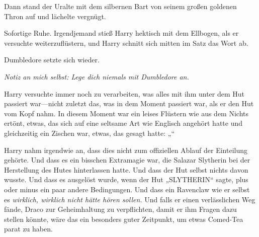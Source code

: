 Dann stand der Uralte mit dem silbernen Bart von seinem großen goldenen Thron auf und lächelte vergnügt.

Sofortige Ruhe. Irgendjemand stieß Harry hektisch mit dem Ellbogen, als er versuchte weiterzuflüstern, und Harry schnitt sich mitten im Satz das Wort ab.

Dumbledore setzte sich wieder.

\emph{Notiz an mich selbst: Lege dich niemals mit Dumbledore an.}

Harry versuchte immer noch zu verarbeiten, was alles mit ihm unter dem Hut passiert war—nicht zuletzt das, was in dem Moment passiert war, als er den Hut vom Kopf nahm. In diesem Moment war ein leises Flüstern wie aus dem Nichts ertönt, etwas, das sich auf eine seltsame Art wie Englisch angehört hatte und gleichzeitig ein Zischen war, etwas, das gesagt hatte: „“

Harry nahm irgendwie an, dass dies nicht zum offiziellen Ablauf der Einteilung gehörte. Und dass es ein bisschen Extramagie war, die Salazar Slytherin bei der Herstellung des Hutes hinterlassen hatte. Und dass der Hut selbst nichts davon wusste. Und dass es ausgelöst wurde, wenn der Hut „SLYTHERIN“ sagte, plus oder minus ein paar andere Bedingungen. Und dass ein Ravenclaw wie er selbst es \emph{wirklich, wirklich nicht hätte hören sollen.} Und falls er einen verlässlichen Weg fände, Draco zur Geheimhaltung zu verpflichten, damit er ihm Fragen dazu stellen könnte, wäre das ein besonders guter Zeitpunkt, um etwas Comed-Tea parat zu haben.

